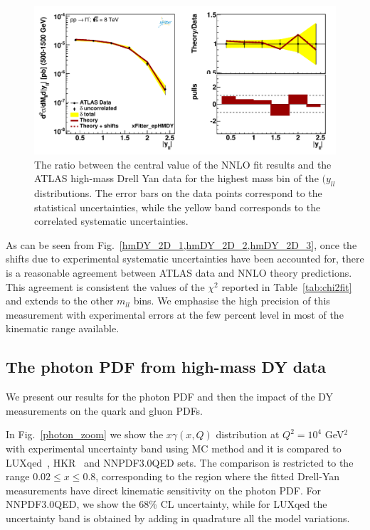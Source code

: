 \begin{figure}[t]
\centering
\includegraphics[width=16cm]{figs/data_405-1.pdf}
\caption{The ratio between the central value of the NNLO fit results
  and the ATLAS high-mass Drell Yan data
  for the highest mass bin of the $(y_{ll}$ distributions.
  The error bars on the data points correspond to the statistical
  uncertainties, while the yellow band
  corresponds to the correlated systematic uncertainties.
}
\label{hmDY_2D_3}
\end{figure}

As can be seen from Fig.~\ref{hmDY_2D_1,hmDY_2D_2,hmDY_2D_3}, once the shifts due to
experimental systematic uncertainties have been accounted for, there
is a reasonable agreement between ATLAS data and NNLO theory
predictions.
%
This agreement is consistent the values of the $\chi^2$ reported in
Table~\ref{tab:chi2fit} and extends to the other $m_{ll}$ bins.
%
We emphasise the high precision of this measurement with experimental
errors at the few percent level in most of the kinematic range
available.


\subsection{The photon PDF from high-mass DY data}
%
We present our results for the photon PDF and then the impact
of the DY measurements on the quark and gluon PDFs.
%

In Fig.~\ref{photon_zoom} we show  the $x\gamma(x,Q)$ distribution at
$Q^2=10^4$ GeV$^2$ with experimental uncertainty band using MC method and it is compared to LUXqed~\cite{Manohar:2016nzj},
HKR~\cite{Harland-Lang:2016apc} and NNPDF3.0QED sets.
%
The comparison is restricted to the range $0.02 \le x \le 0.8$,
corresponding to the region where the fitted Drell-Yan measurements
have direct kinematic sensitivity on the photon PDF.
%
For NNPDF3.0QED, we show the 68\% CL uncertainty, while for LUXqed the
uncertainty band is obtained by adding in quadrature all the model
variations.

